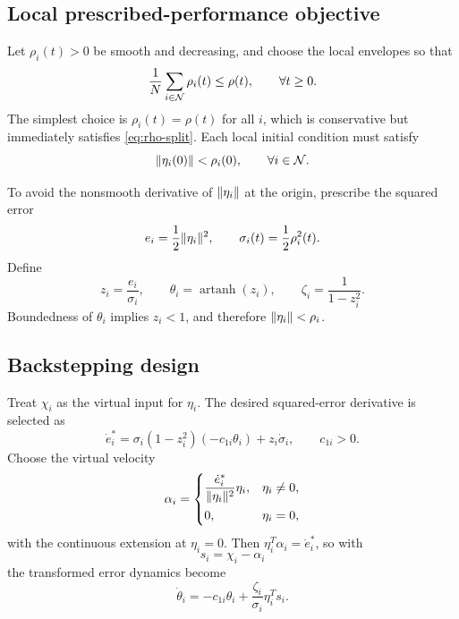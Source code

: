 \subsection{Local prescribed-performance objective}

Let $\rho_i(t)>0$ be smooth and decreasing, and choose the local envelopes so
that
\begin{equation}
\frac1N\sum_{i\in\mathcal{N}}\rho_i(t)\le \rho(t),\qquad \forall t\ge0.
\label{eq:rho-split}
\end{equation}
The simplest choice is $\rho_i(t)=\rho(t)$ for all $i$, which is conservative
but immediately satisfies \eqref{eq:rho-split}.  Each local initial condition
must satisfy
\begin{equation}
\lVert \eta_i(0) \rVert<\rho_i(0),\qquad \forall i\in\mathcal{N}.
\label{eq:local-feas}
\end{equation}

To avoid the nonsmooth derivative of $\lVert \eta_i \rVert$ at the origin, prescribe
the squared error
\[
e_i=\frac12\lVert \eta_i \rVert^2,\qquad
\sigma_i(t)=\frac12\rho_i^2(t).
\]
Define
\begin{equation}
z_i=\frac{e_i}{\sigma_i},\qquad
\theta_i=\operatorname{artanh}(z_i),\qquad
\zeta_i=\frac{1}{1-z_i^2}.
\label{eq:local-ppc-transform}
\end{equation}
Boundedness of $\theta_i$ implies $z_i<1$, and therefore
$\lVert \eta_i \rVert<\rho_i$.

\subsection{Backstepping design}

Treat $\chi_i$ as the virtual input for $\eta_i$.  The desired squared-error
derivative is selected as
\[
\dot e_i^*
=\sigma_i(1-z_i^2)(-c_{1i}\theta_i)+z_i\dot\sigma_i,
\qquad c_{1i}>0.
\]
Choose the virtual velocity
\begin{equation}
\alpha_i=
\begin{cases}
\displaystyle
\frac{\dot e_i^*}{\lVert \eta_i \rVert^2}\eta_i, & \eta_i\neq0,\\[8pt]
0, & \eta_i=0,
\end{cases}
\label{eq:alpha-i}
\end{equation}
with the continuous extension at $\eta_i=0$.  Then
$\eta_i^T\alpha_i=\dot e_i^*$, so with
\[
s_i=\chi_i-\alpha_i
\]
the transformed error dynamics become
\begin{equation}
\dot\theta_i
=-c_{1i}\theta_i+\frac{\zeta_i}{\sigma_i}\eta_i^Ts_i.
\label{eq:theta-dyn}
\end{equation}

